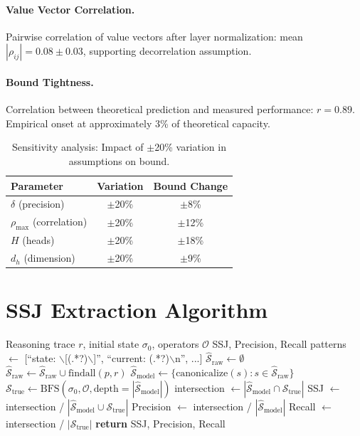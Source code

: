 \documentclass{article}
\theoremstyle{plain}
\theoremstyle{definition}
\theoremstyle{remark}
\begin{document}
\paragraph{Value Vector Correlation.} Pairwise correlation of value vectors after layer normalization: mean $|\rho_{ij}| = 0.08 \pm 0.03$, supporting decorrelation assumption.

\paragraph{Bound Tightness.} Correlation between theoretical prediction and measured performance: $r = 0.89$. Empirical onset at approximately 3\% of theoretical capacity.

\begin{table}[h]
\centering
\caption{Sensitivity analysis: Impact of $\pm$20\% variation in assumptions on bound.}
\label{tab:sensitivity}
\begin{tabular}{@{}lcc@{}}
\toprule
\textbf{Parameter} & \textbf{Variation} & \textbf{Bound Change} \\
\midrule
$\delta$ (precision) & $\pm$20\% & $\pm$8\% \\
$\rho_{\max}$ (correlation) & $\pm$20\% & $\pm$12\% \\
$H$ (heads) & $\pm$20\% & $\pm$18\% \\
$d_h$ (dimension) & $\pm$20\% & $\pm$9\% \\
\bottomrule
\end{tabular}
\end{table}


\section{SSJ Extraction Algorithm}
\label{app:ssj}

\begin{algorithm}[h]
\caption{State-Space Jaccard Extraction}
\begin{algorithmic}[1]
\REQUIRE Reasoning trace $r$, initial state $\sigma_0$, operators $\mathcal{O}$
\ENSURE SSJ, Precision, Recall
\STATE patterns $\leftarrow$ [``state: $\backslash$[(.*?)$\backslash$]'', ``current: (.*?)$\backslash$n'', ...]
\STATE $\hat{\mathcal{S}}_\text{raw} \leftarrow \emptyset$
    \STATE $\hat{\mathcal{S}}_\text{raw} \leftarrow \hat{\mathcal{S}}_\text{raw} \cup \text{findall}(p, r)$
\ENDFOR
\STATE $\hat{\mathcal{S}}_\text{model} \leftarrow \{\text{canonicalize}(s) : s \in \hat{\mathcal{S}}_\text{raw}\}$
\STATE $\mathcal{S}_\text{true} \leftarrow \text{BFS}(\sigma_0, \mathcal{O}, \text{depth}=|\hat{\mathcal{S}}_\text{model}|)$
\STATE intersection $\leftarrow |\hat{\mathcal{S}}_\text{model} \cap \mathcal{S}_\text{true}|$
\STATE SSJ $\leftarrow$ intersection / $|\hat{\mathcal{S}}_\text{model} \cup \mathcal{S}_\text{true}|$
\STATE Precision $\leftarrow$ intersection / $|\hat{\mathcal{S}}_\text{model}|$
\STATE Recall $\leftarrow$ intersection / $|\mathcal{S}_\text{true}|$
\STATE \textbf{return} SSJ, Precision, Recall
\end{algorithmic}
\end{algorithm}
\end{document}
